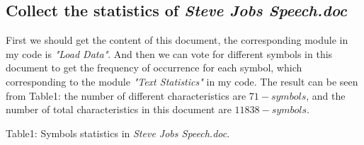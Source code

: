 \documentclass[12pt]{article} %
\numberwithin{equation}{section}
\begin{document}
\subsection{Collect the statistics of \emph{Steve Jobs Speech.doc}}
First we should get the content of this document, the corresponding module in my code is \emph{"Load Data"}. And then we can vote for different symbols in this document to get the frequency of occurrence for each symbol, which corresponding to the module \emph{"Text Statistics"} in my code. The result can be seen from Table1: the number of different characteristics are $71- symbols$, and the number of total characteristics in this document are $11838-symbols$.


\begin{center}
  Table1: Symbols statistics in \emph{Steve Jobs Speech.doc}.
\end{center}

\setlength{\arrayrulewidth}{0.7mm}
\end{document}
